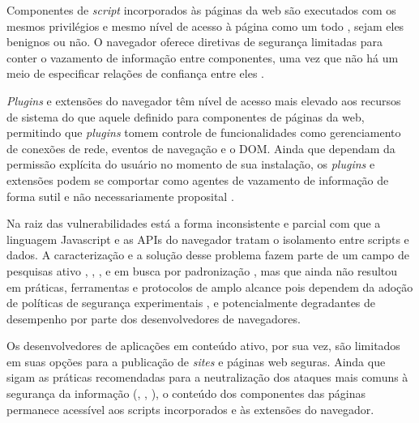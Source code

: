 \begin{alineas}
	\item Componentes de \textit{script} incorporados às páginas da web são executados com os mesmos privilégios e mesmo nível de acesso à página como um todo \cite[p. 2-3]{DeRyck2012}, sejam eles benignos ou não. O navegador oferece diretivas de segurança limitadas para conter o vazamento de informação entre componentes, uma vez que não há um meio de especificar relações de confiança entre eles \cite{Jang2010}.
	\item \textit{Plugins} e extensões do navegador têm nível de acesso mais elevado aos recursos de sistema do que aquele definido para componentes de páginas da web, permitindo que \textit{plugins} tomem controle de funcionalidades como gerenciamento de conexões de rede, eventos de navegação e o DOM. Ainda que dependam da permissão explícita do usuário no momento de sua instalação, os \textit{plugins} e extensões podem se comportar como agentes de vazamento de informação de forma sutil e não necessariamente proposital \cite{Heule2015}.
\end{alineas}

Na raiz das vulnerabilidades está a forma inconsistente e parcial com que a linguagem Javascript e as APIs do navegador tratam o isolamento entre scripts e dados. A caracterização e a solução desse problema fazem parte de um campo de pesquisas ativo \cite{Stefan2014}, \cite{Hedin2014}, \cite{Bichhawat2014}, \cite{Magazinius2014} e em busca por padronização \cite{W3C:WebAppSec}, mas que ainda não resultou em práticas, ferramentas e protocolos de amplo alcance pois dependem da adoção de políticas de segurança experimentais \cite{Hedin2014}, \cite{Bichhawat2014} e potencialmente degradantes de desempenho \cite[p. 14]{Stefan2014} por parte dos desenvolvedores de navegadores.

Os desenvolvedores de aplicações em conteúdo ativo, por sua vez, são limitados em suas opções para a publicação de \textit{sites} e páginas web seguras. Ainda que sigam as práticas recomendadas para a neutralização dos ataques mais comuns à segurança da informação (\cite{W3C:CORS}, \cite{W3C:SOP}, \cite{W3C:CSP}), o conteúdo dos componentes das páginas permanece acessível aos scripts incorporados e às extensões do navegador.



